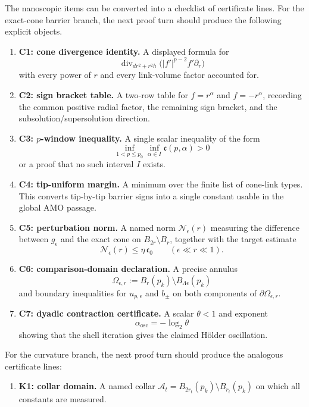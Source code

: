 \begin{remark}
\label{rem:TipNeckPicoCertificateRoadmap}
The nanoscopic items can be converted into a checklist of certificate lines.
For the exact-cone barrier branch, the next proof turn should produce the
following explicit objects.
\begin{enumerate}
    \item \textbf{C1: cone divergence identity.}
    A displayed formula for
    \[
        \operatorname{div}_{dr^2+r^2h}\bigl(|f'|^{p-2}f'\partial_r\bigr)
    \]
    with every power of \(r\) and every link-volume factor accounted for.

    \item \textbf{C2: sign bracket table.}
    A two-row table for \(f=r^\alpha\) and \(f=-r^\alpha\), recording the
    common positive radial factor, the remaining sign bracket, and the
    subsolution/supersolution direction.

    \item \textbf{C3: \(p\)-window inequality.}
    A single scalar inequality of the form
    \[
        \inf_{1<p\le p_0}\inf_{\alpha\in I}\mathfrak c(p,\alpha)>0
    \]
    or a proof that no such interval \(I\) exists.

    \item \textbf{C4: tip-uniform margin.}
    A minimum over the finite list of cone-link types.  This converts
    tip-by-tip barrier signs into a single constant usable in the global AMO
    passage.

    \item \textbf{C5: perturbation norm.}
    A named norm \(\mathcal N_\epsilon(r)\) measuring the difference between
    \(g_\epsilon\) and the exact cone on \(B_{2r}\setminus B_r\), together with
    the target estimate
    \[
        \mathcal N_\epsilon(r)\le \eta\,\mathfrak c_0
        \qquad(\epsilon\ll r\ll1).
    \]

    \item \textbf{C6: comparison-domain declaration.}
    A precise annulus
    \[
        \Omega_{\epsilon,r}:=B_r(p_k)\setminus B_{\Lambda\epsilon}(p_k)
    \]
    and boundary inequalities for \(u_{p,\epsilon}\) and \(b_\pm\) on both
    components of \(\partial\Omega_{\epsilon,r}\).

    \item \textbf{C7: dyadic contraction certificate.}
    A scalar \(\theta<1\) and exponent
    \[
        \alpha_{\mathrm{osc}}=-\log_2\theta
    \]
    showing that the shell iteration gives the claimed Hölder oscillation.
\end{enumerate}
For the curvature branch, the next proof turn should produce the analogous
certificate lines:
\begin{enumerate}
    \item \textbf{K1: collar domain.}
    A named collar \(\mathcal A_t=B_{2r_t}(p_k)\setminus B_{r_t}(p_k)\) on
    which all constants are measured.


\end{enumerate}
\end{remark}
